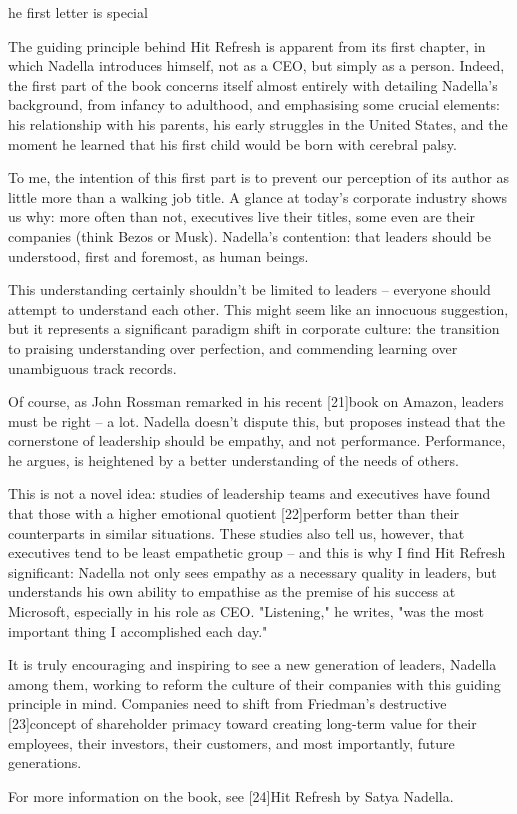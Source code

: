 \label{ch:hit-refresh}

he first letter is special



   The guiding principle behind Hit Refresh is apparent from its first
   chapter, in which Nadella introduces himself, not as a CEO, but simply
   as a person. Indeed, the first part of the book concerns itself almost
   entirely with detailing Nadella's background, from infancy to
   adulthood, and emphasising some crucial elements: his relationship with
   his parents, his early struggles in the United States, and the moment
   he learned that his first child would be born with cerebral palsy.

   To me, the intention of this first part is to prevent our perception of
   its author as little more than a walking job title. A glance at today's
   corporate industry shows us why: more often than not, executives live
   their titles, some even are their companies (think Bezos or Musk).
   Nadella's contention: that leaders should be understood, first and
   foremost, as human beings.

   This understanding certainly shouldn't be limited to leaders --
   everyone should attempt to understand each other. This might seem like
   an innocuous suggestion, but it represents a significant paradigm shift
   in corporate culture: the transition to praising understanding over
   perfection, and commending learning over unambiguous track records.

   Of course, as John Rossman remarked in his recent [21]book on Amazon,
   leaders must be right -- a lot. Nadella doesn't dispute this, but
   proposes instead that the cornerstone of leadership should be empathy,
   and not performance. Performance, he argues, is heightened by a better
   understanding of the needs of others.

   This is not a novel idea: studies of leadership teams and executives
   have found that those with a higher emotional quotient [22]perform
   better than their counterparts in similar situations. These studies
   also tell us, however, that executives tend to be least empathetic
   group -- and this is why I find Hit Refresh significant: Nadella not
   only sees empathy as a necessary quality in leaders, but understands
   his own ability to empathise as the premise of his success at
   Microsoft, especially in his role as CEO. "Listening," he writes, "was
   the most important thing I accomplished each day."

   It is truly encouraging and inspiring to see a new generation of
   leaders, Nadella among them, working to reform the culture of their
   companies with this guiding principle in mind. Companies need to shift
   from Friedman's destructive [23]concept of shareholder primacy toward
   creating long-term value for their employees, their investors, their
   customers, and most importantly, future generations.


   For more information on the book, see [24]Hit Refresh by Satya Nadella.

